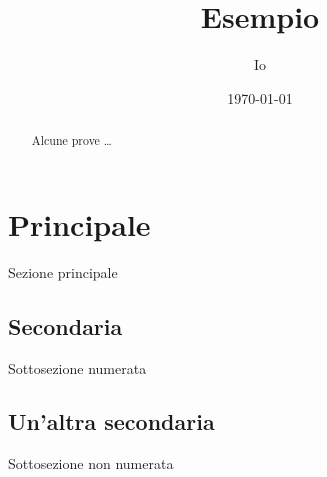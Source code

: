 \documentclass{article}
\title{Esempio}
\author{Io}
\date{\today}
\begin{document}
\maketitle

\begin{abstract}
	Alcune prove \dots
\end{abstract}

\tableofcontents

\section{Principale}
  Sezione principale
  \subsection{Secondaria}
     Sottosezione numerata
  \subsection*{Un'altra secondaria}
     Sottosezione non numerata
\end{document}
